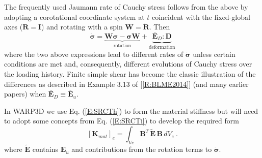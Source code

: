\documentclass[11pt]{report}
\numberwithin{equation}{section}
\newcommand{\bmf } {\boldsymbol }  %
\newcommand{\nid}{\noindent}
\newcommand{\dotR} {\dot{\mathbf{R}}}
\begin{document}
The frequently used Jaumann rate of Cauchy stress follows from the above by
adopting a corotational coordinate system at $t$ coincident 
with the fixed-global axes ($\mathbf{R}=\mathbf{I}$)
and rotating with a  spin $\mathbf{W}=\dotR$. Then
%
\begin{equation}\label{E:SRCTi}
\dot{\bmf{\sigma}}=\underbrace{\mathbf{W}\bmf{\sigma} -
	\bmf{\sigma}\mathbf{W}}_{\text{rotation}} +
	\underbrace{\overline{\mathbf{E}}_D:\mathbf{D}}_{\text{deformation}}
\end{equation}
%
\nid where the two above expressions lead to different rates of $\dot{\bmf{\sigma}}$
unless certain conditions are met and, consequently, different evolutions of Cauchy stress
over the loading history. Finite simple shear has become the classic illustration of 
the differences as described in 
Example 3.13 of [\ref{R:BLME2014}] (and many earlier papers) when 
$\overline{\mathbf{E}}_D\equiv \overline{\mathbf{E}}_u$.


In WARP3D we use Eq. (\ref{E:SRCTh}) to form the material stiffness but will need to
adopt some concepts from Eq. (\ref{E:SRCTi}) to develop the required form 
%
\begin{equation}\label{E:SRCTj}
 \left [ \mathbf{K}_{mat} \right ]_e =  
 \int_{Ve} \mathbf{B}^T\, \tilde {\mathbf{E}}\, \mathbf{B} \, dV_e\ .
\end{equation}
%
\nid where  $\tilde {\mathbf{E}}$ contains $\mathbf{E}_u$
and contributions from the rotation terms to $\dot{\bmf{\sigma}}$.
\end{document}
